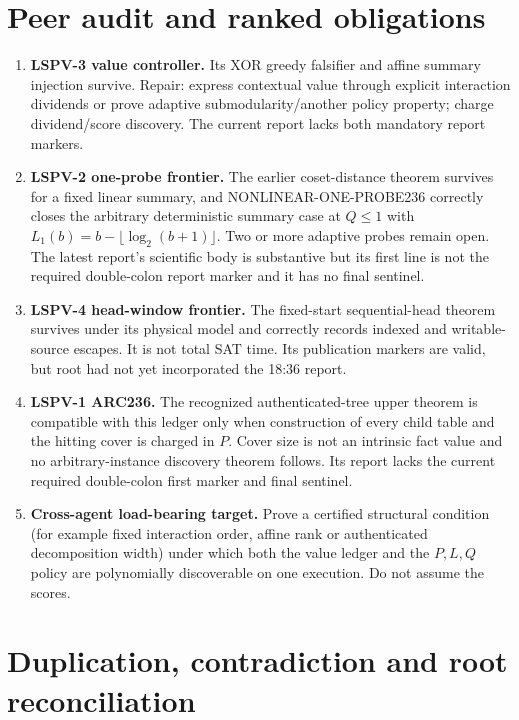 \documentclass[11pt]{article}
\begin{document}
\section{Peer audit and ranked obligations}
\begin{enumerate}
\item \textbf{LSPV-3 value controller.}  Its XOR greedy falsifier and affine
summary injection survive.  Repair: express contextual value through explicit
interaction dividends or prove adaptive submodularity/another policy property;
charge dividend/score discovery.  The current report lacks both mandatory
report markers.
\item \textbf{LSPV-2 one-probe frontier.}  The earlier coset-distance theorem
survives for a fixed linear summary, and NONLINEAR-ONE-PROBE236 correctly closes
the arbitrary deterministic summary case at $Q\le1$ with
$L_1(b)=b-\lfloor\log_2(b+1)\rfloor$.  Two or more adaptive probes remain
open.  The latest report's scientific body is substantive but its first line
is not the required double-colon report marker and it has no final sentinel.
\item \textbf{LSPV-4 head-window frontier.}  The fixed-start sequential-head
theorem survives under its physical model and correctly records indexed and
writable-source escapes.  It is not total SAT time.  Its publication markers
are valid, but root had not yet incorporated the 18:36 report.
\item \textbf{LSPV-1 ARC236.}  The recognized authenticated-tree upper theorem
is compatible with this ledger only when construction of every child table and
the hitting cover is charged in $P$.  Cover size is not an intrinsic fact value
and no arbitrary-instance discovery theorem follows.  Its report lacks the
current required double-colon first marker and final sentinel.
\item \textbf{Cross-agent load-bearing target.}  Prove a certified structural
condition (for example fixed interaction order, affine rank or authenticated
decomposition width) under which both the value ledger and the $P,L,Q$ policy
are polynomially discoverable on one execution.  Do not assume the scores.
\end{enumerate}

\section{Duplication, contradiction and root reconciliation}
\end{document}
